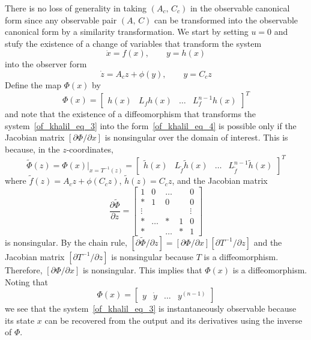 \documentclass[11pt,a4paper,oneside]{book}
\numberwithin{equation}{section}
\theoremstyle{it}
\theoremstyle{definition}
\begin{document}
There is no loss of generality in taking $(A_c,\,C_c)$ in the observable canonical form since any observable pair $(A,\,C)$ can be transformed into the observable canonical form by a similarity transformation.  We start by setting $u=0$ and stufy the existence of a change of variables that transform the system
\begin{equation}\label{of_khalil_eq_3}
	\dot{x}=f(x),\qquad y=h(x)
\end{equation}
into the observer form
\begin{equation}\label{of_khalil_eq_4}
	\dot{z}=A_cz+\phi(y),\qquad y=C_cz
\end{equation}
Define the map $\Phi(x)$ by
\begin{equation*}
	\Phi(x)=\begin{bmatrix} h(x)&L_fh(x)&\dots&L_f^{n-1}h(x) \end{bmatrix}^T
\end{equation*}
and note that the existence of a diffeomorphism that transforms the system~\eqref{of_khalil_eq_3} into the form~\eqref{of_khalil_eq_4} is possible only if the Jacobian matrix $[\partial \Phi/\partial x]$ is nonsingular over the domain of interest. This is because, in the $z$-coordinates,
\begin{equation*}
	\tilde{\Phi}(z)=\Phi(x)\Bigg|_{x=T^{-1}(z)}=\begin{bmatrix} \tilde{h}(x) &L_{\tilde{f}}\tilde{h}(x) & \dots &L_{\tilde{f}}^{n-1}\tilde{h}(x) \end{bmatrix}^T
\end{equation*}
where $\tilde{f}(z)=A_cz+\phi(C_cz)$, $\tilde{h}(z)=C_cz$, and the Jacobian matrix
\begin{equation*}
	\frac{\partial \tilde{\Phi}}{\partial z}=\begin{bmatrix} 1&0&\dots& &0 \\[6pt] * & 1 & 0 & & 0 \\[6pt] \vdots& & & & \vdots \\[6pt] *&\dots& * & 1 & 0 \\[6pt] *& & \dots&*&1 \end{bmatrix}
\end{equation*}
is nonsingular. By the chain rule, $[\partial\tilde{\Phi}/\partial z]=[\partial \Phi/\partial x][\partial T^{-1}/\partial z]$ and the Jacobian matrix $[\partial T^{-1}/\partial z]$ is nonsingular because $T$ is a diffeomorphism. Therefore, $[\partial \Phi/\partial x]$ is nonsingular. This implies that $\Phi(x)$ is a diffeomorphism. Noting that
\begin{equation*}
	\Phi(x) = \begin{bmatrix} y&\dot{y} & \dots & y^{(n-1)} \end{bmatrix}
\end{equation*}
we see that the system~\eqref{of_khalil_eq_3} is instantaneously observable because its state $x$ can be recovered from the output and its derivatives using the inverse of $\Phi$.
\end{document}
